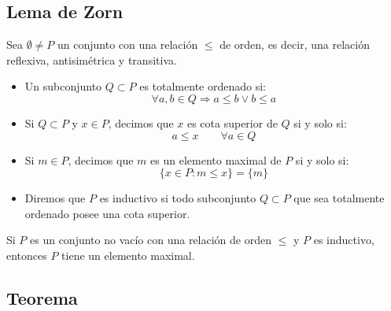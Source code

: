 \subsection{Lema de Zorn}
\begin{definicion}
    Sea $\emptyset \neq P$ un conjunto con una relación $\leq$ de orden, es decir, una relación reflexiva, antisimétrica y transitiva.
    \begin{itemize}
        \item Un subconjunto $Q\subset P$ es totalmente ordenado si:
            \begin{equation*}
                \forall a,b\in Q \Longrightarrow a\leq b \lor b\leq a
            \end{equation*}
        \item Si $Q\subset P$ y $x\in P$, decimos que $x$ es cota superior de $Q$ si y solo si:
            \begin{equation*}
                a\leq x \qquad \forall a\in Q
            \end{equation*}
        \item Si $m\in P$, decimos que $m$ es un elemento maximal de $P$ si y solo si:
            \begin{equation*}
                \{x\in P : m \leq x\} = \{m\}
            \end{equation*}
        \item Diremos que $P$ es inductivo si todo subconjunto $Q\subset P$ que sea totalmente ordenado posee una cota superior.
    \end{itemize}
\end{definicion}

\begin{lema}[de Zorn]
    Si $P$ es un conjunto no vacío con una relación de orden $\leq$ y $P$  es inductivo, entonces $P$ tiene un elemento maximal.
\end{lema}

\subsection{Teorema}

